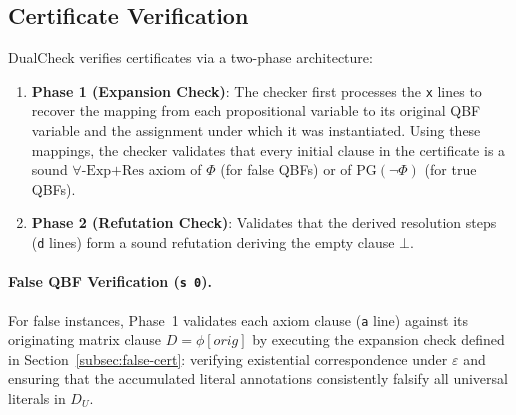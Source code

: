 \documentclass[runningheads]{llncs}
\newcommand{\ExpRes}{\forall\text{-}\mathrm{Exp}\text{+}\mathrm{Res}}
\newcommand{\PG}{\mathrm{PG}}
\begin{document}
\subsection{Certificate Verification}
\label{subsec:verification}

DualCheck verifies certificates via a two-phase architecture:
\begin{enumerate}
    \item \textbf{Phase 1 (Expansion Check)}:
          The checker first processes the \texttt{x} lines to recover the mapping from each propositional variable to its original QBF variable and the assignment under which it was instantiated.
          Using these mappings, the checker validates that every initial clause in the certificate is a sound $\ExpRes$ axiom of $\Phi$ (for false QBFs) or of $\PG(\neg\Phi)$ (for true QBFs).
    \item \textbf{Phase 2 (Refutation Check)}:
          Validates that the derived resolution steps (\texttt{d} lines) form a sound refutation deriving the empty clause $\bot$.
\end{enumerate}

\paragraph*{False QBF Verification (\texttt{s 0}).}
For false instances, Phase~1 validates each axiom clause (\texttt{a} line) against its originating matrix clause $D = \phi[\mathit{orig}]$ by executing the expansion check defined in Section~\ref{subsec:false-cert}: verifying existential correspondence under $\varepsilon$ and ensuring that the accumulated literal annotations consistently falsify all universal literals in $D_U$.
\end{document}
